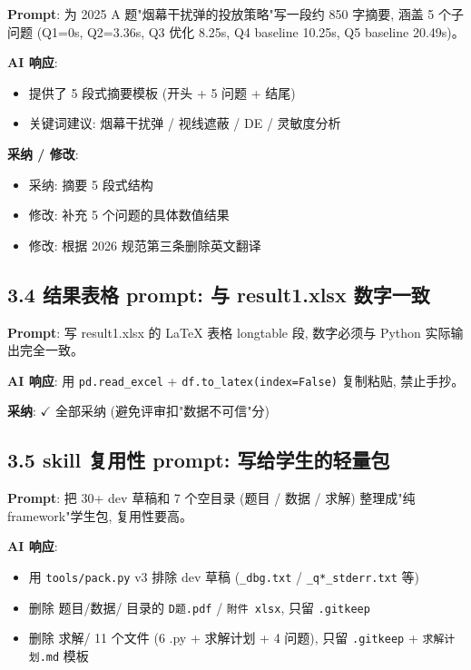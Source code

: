 \documentclass[electronic]{format}
\renewcommand{\textbf}[1]{{\song\bfseries #1}}
\begin{document}
\textbf{Prompt}: 为 2025 A 题"烟幕干扰弹的投放策略"写一段约 850 字摘要, 涵盖 5 个子问题 (Q1=0s, Q2=3.36s, Q3 优化 8.25s, Q4 baseline 10.25s, Q5 baseline 20.49s)。

\textbf{AI 响应}:
\begin{itemize}
  \item 提供了 5 段式摘要模板 (开头 + 5 问题 + 结尾)
  \item 关键词建议: 烟幕干扰弹 / 视线遮蔽 / DE / 灵敏度分析
\end{itemize}

\textbf{采纳 / 修改}:
\begin{itemize}
  \item 采纳: 摘要 5 段式结构
  \item 修改: 补充 5 个问题的具体数值结果
  \item 修改: 根据 2026 规范第三条删除英文翻译
\end{itemize}

\subsection{3.4 结果表格 prompt: 与 result1.xlsx 数字一致}

\textbf{Prompt}: 写 result1.xlsx 的 LaTeX 表格 longtable 段, 数字必须与 Python 实际输出完全一致。

\textbf{AI 响应}: 用 \texttt{pd.read\_excel} + \texttt{df.to\_latex(index=False)} 复制粘贴, 禁止手抄。

\textbf{采纳}: $\checkmark$ 全部采纳 (避免评审扣"数据不可信"分)

\subsection{3.5 skill 复用性 prompt: 写给学生的轻量包}

\textbf{Prompt}: 把 30+ dev 草稿和 7 个空目录 (题目 / 数据 / 求解) 整理成"纯 framework"学生包, 复用性要高。

\textbf{AI 响应}:
\begin{itemize}
  \item 用 \texttt{tools/pack.py} v3 排除 dev 草稿 (\texttt{\_dbg.txt} / \texttt{\_q*\_stderr.txt} 等)
  \item 删除 题目/数据/ 目录的 \texttt{D题.pdf} / \texttt{附件 xlsx}, 只留 \texttt{.gitkeep}
  \item 删除 求解/ 11 个文件 (6 .py + 求解计划 + 4 问题), 只留 \texttt{.gitkeep} + \texttt{求解计划.md} 模板
\end{itemize}
\end{document}
